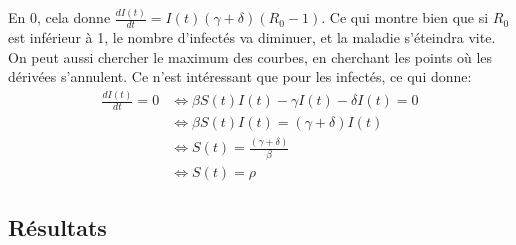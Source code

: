 \documentclass{article}
\begin{document}
	En $0$, cela donne $\frac{dI(t)}{dt} = I(t)(\gamma + \delta)(R_0 - 1)$. Ce qui montre bien que si $R_0$ est inférieur à 1, le nombre d'infectés va diminuer, et la maladie s'éteindra vite.\\[0.2cm]
	
	On peut aussi chercher le maximum des courbes, en cherchant les points où les dérivées s'annulent. Ce n'est intéressant que pour les infectés, ce qui donne: 
	\begin{align*}
		\frac{dI(t)}{dt} = 0 &\Leftrightarrow \beta S(t)I(t) - \gamma I(t) - \delta I(t) = 0 \\
		                     &\Leftrightarrow \beta S(t)I(t) = (\gamma + \delta) I(t) \\
		                     &\Leftrightarrow S(t) = \frac{(\gamma + \delta)}{\beta} \\
		                     &\Leftrightarrow S(t) = \rho
	\end{align*}

\subsection{Résultats}




\lstset{breaklines=true}

%
\end{document}
